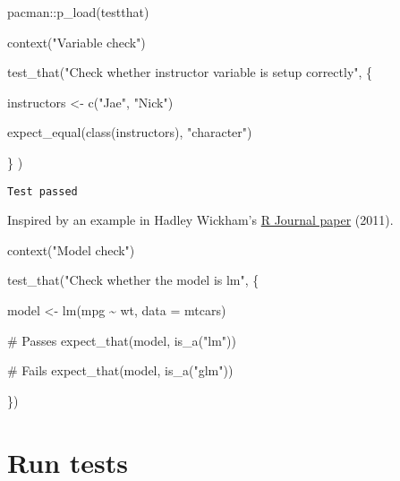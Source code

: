 \documentclass[
  letterpaper,
  DIV=11,
  numbers=noendperiod]{scrreprt}
\newenvironment{Shaded}{\begin{snugshade}}{\end{snugshade}}
\newcommand{\AttributeTok}[1]{\textcolor[rgb]{0.40,0.45,0.13}{#1}}
\newcommand{\CommentTok}[1]{\textcolor[rgb]{0.37,0.37,0.37}{#1}}
\newcommand{\FunctionTok}[1]{\textcolor[rgb]{0.28,0.35,0.67}{#1}}
\newcommand{\NormalTok}[1]{\textcolor[rgb]{0.00,0.23,0.31}{#1}}
\newcommand{\OtherTok}[1]{\textcolor[rgb]{0.00,0.23,0.31}{#1}}
\newcommand{\SpecialCharTok}[1]{\textcolor[rgb]{0.37,0.37,0.37}{#1}}
\newcommand{\StringTok}[1]{\textcolor[rgb]{0.13,0.47,0.30}{#1}}
\begin{document}
\begin{Shaded}
\begin{Highlighting}[]
\NormalTok{pacman}\SpecialCharTok{::}\FunctionTok{p\_load}\NormalTok{(testthat)}

\FunctionTok{context}\NormalTok{(}\StringTok{"Variable check"}\NormalTok{)}

\FunctionTok{test\_that}\NormalTok{(}\StringTok{"Check whether instructor variable is setup correctly"}\NormalTok{, \{}
  
\NormalTok{  instructors }\OtherTok{\textless{}{-}} \FunctionTok{c}\NormalTok{(}\StringTok{"Jae"}\NormalTok{, }\StringTok{"Nick"}\NormalTok{)}

  \FunctionTok{expect\_equal}\NormalTok{(}\FunctionTok{class}\NormalTok{(instructors), }\StringTok{"character"}\NormalTok{)}

\NormalTok{\}}
\NormalTok{)}
\end{Highlighting}
\end{Shaded}

\begin{verbatim}
Test passed 
\end{verbatim}

Inspired by an example in Hadley Wickham's
\href{https://journal.r-project.org/archive/2011-1/RJournal_2011-1_Wickham.pdf}{R
Journal paper} (2011).

\begin{Shaded}
\begin{Highlighting}[]
\FunctionTok{context}\NormalTok{(}\StringTok{"Model check"}\NormalTok{)}

\FunctionTok{test\_that}\NormalTok{(}\StringTok{"Check whether the model is lm"}\NormalTok{, \{}
  
\NormalTok{  model }\OtherTok{\textless{}{-}} \FunctionTok{lm}\NormalTok{(mpg }\SpecialCharTok{\textasciitilde{}}\NormalTok{ wt, }\AttributeTok{data =}\NormalTok{ mtcars)}
  
  \CommentTok{\# Passes}
  \FunctionTok{expect\_that}\NormalTok{(model, }\FunctionTok{is\_a}\NormalTok{(}\StringTok{"lm"}\NormalTok{))}

  \CommentTok{\# Fails}
  \FunctionTok{expect\_that}\NormalTok{(model, }\FunctionTok{is\_a}\NormalTok{(}\StringTok{"glm"}\NormalTok{))}

\NormalTok{\})}
\end{Highlighting}
\end{Shaded}

\hypertarget{run-tests}{%
\section*{Run tests}\label{run-tests}}
\end{document}
